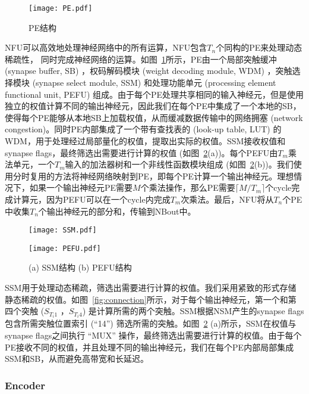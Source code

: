 \begin{figure}[h]
\centering
\texttt{[image: PE.pdf]}
\caption{PE结构}
\label{fig:PE}
\end{figure}

NFU可以高效地处理神经网络中的所有运算，NFU包含$T_n$个同构的PE来处理动态稀疏性， 同时完成神经网络的运算。如图~\ref{fig:PE}所示，PE由一个局部突触缓冲 (synapse buffer, SB) ，权码解码模块 (weight decoding module, WDM) ，突触选择模块 (synapse select module, SSM) 和处理功能单元 (processing element functional unit, PEFU) 组成。由于每个PE处理共享相同的输入神经元，但是使用独立的权值计算不同的输出神经元，因此我们在每个PE中集成了一个本地的SB，使得每个PE能够从本地SB上加载权值，从而缓减数据传输中的网络拥塞 (network congestion)。同时PE内部集成了一个带有查找表的 (look-up table, LUT) 的WDM，用于处理经过局部量化的权值，提取出实际的权值。SSM接收权值和synapse flags，最终筛选出需要进行计算的权值 (如图~\ref{fig:PEFU}(a))。每个PEFU由$T_m$乘法单元，一个$T_m$输入的加法器树和一个非线性函数模块组成 (如图~\ref{fig:PEFU}(b))。我们使用分时复用的方法将神经网络映射到PE，即每个PE计算一个输出神经元。理想情况下，如果一个输出神经元PE需要$M$个乘法操作，那么PE需要$\lceil M/T_{m} \rceil$个cycle完成计算元，因为PEFU可以在一个cycle内完成$T_m$次乘法。最后，NFU将从$T_n$个PE中收集$T_n$个输出神经元的部分和，传输到NBout中。

\begin{figure}[h]
\centering
\begin{minipage}[b]{0.54\columnwidth}
\texttt{[image: SSM.pdf]}
\end{minipage}
\hfill
\begin{minipage}[b]{0.44\columnwidth}
\texttt{[image: PEFU.pdf]}
\end{minipage}
\caption{(a) SSM结构 (b) PEFU结构}
\label{fig:PEFU}
\end{figure}


SSM用于处理动态稀疏，筛选出需要进行计算的权值。我们采用紧致的形式存储静态稀疏的权值。如图~\ref{fig:connection}所示，对于每个输出神经元，第一个和第四个突触 ($S_{T_{i}1}$ ，$S_{T_{i}4}$) 是计算所需的两个突触。SSM根据NSM产生的synapse flags包含所需突触位置索引 (“14”) 筛选所需的突触。如图~\ref{fig:PEFU} (a)所示，SSM在权值与synapse flags之间执行 “MUX” 操作，最终筛选出需要进行计算的权值。由于每个PE接收不同的权值，并且处理不同的输出神经元，我们在每个PE内部局部集成SSM和SB，从而避免高带宽和长延迟。

\subsubsection{Encoder}

